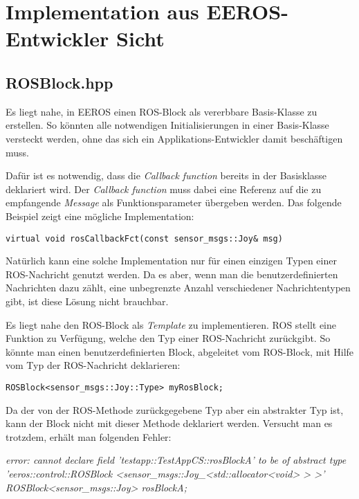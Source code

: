 \chapter{Implementation aus EEROS-Entwickler Sicht}


\section{ROSBlock.hpp}
Es liegt nahe, in EEROS einen ROS-Block als vererbbare Basis-Klasse zu erstellen.
So könnten alle notwendigen Initialisierungen in einer Basis-Klasse versteckt werden, ohne das sich ein Applikations-Entwickler damit beschäftigen muss.

Dafür ist es notwendig, dass die \textit{Callback function} bereits in der Basisklasse deklariert wird.
Der \textit{Callback function} muss dabei eine Referenz auf die zu empfangende \textit{Message} als Funktionsparameter übergeben werden.
Das folgende Beispiel zeigt eine mögliche Implementation:

\lstset{language=C++}
\begin{lstlisting}
virtual void rosCallbackFct(const sensor_msgs::Joy& msg)
\end{lstlisting}

Natürlich kann eine solche Implementation nur für einen einzigen Typen einer ROS-Nachricht genutzt werden.
Da es aber, wenn man die benutzerdefinierten Nachrichten dazu zählt, eine unbegrenzte Anzahl verschiedener Nachrichtentypen gibt, ist diese Lösung nicht brauchbar. %

Es liegt nahe den ROS-Block als \textit{Template} zu implementieren.
ROS stellt eine Funktion zu Verfügung, welche den Typ einer ROS-Nachricht zurückgibt.
So könnte man einen benutzerdefinierten Block, abgeleitet vom ROS-Block, mit Hilfe vom Typ der ROS-Nachricht deklarieren:

\lstset{language=C++}
\begin{lstlisting}
ROSBlock<sensor_msgs::Joy::Type> myRosBlock;
\end{lstlisting}

Da der von der ROS-Methode zurückgegebene Typ aber ein abstrakter Typ ist, kann der Block nicht mit dieser Methode deklariert werden.
Versucht man es trotzdem, erhält man folgenden Fehler:

\textit{
error: cannot declare field 'testapp::TestAppCS::rosBlockA' to be of abstract type 'eeros::control::ROSBlock
<sensor\_msgs::Joy\_<std::allocator<void> > >'\\
\-\hspace{2cm} ROSBlock<sensor\_msgs::Joy> rosBlockA;
}

